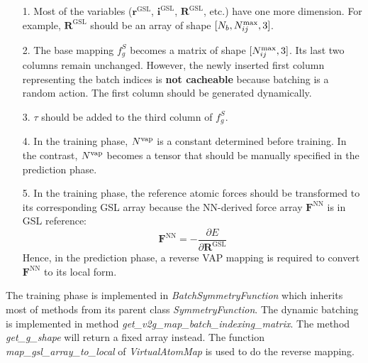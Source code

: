 \documentclass[preprint]{revtex4-2}
\begin{document}
\begin{itemize}
    
    \item[1.] 
    Most of the variables ($\mathbf{r}^{\mathrm{GSL}}$, 
    $\mathbf{i}^{\mathrm{GSL}}$, $\mathbf{R}^{\mathrm{GSL}}$, etc.) have one 
    more dimension. For example, $\mathbf{R}^{\mathrm{GSL}}$ should be an array
    of shape $[N_b, N_{ij}^{\mathrm{max}}, 3]$.

    \item[2.] 
    The base mapping $f_{g}^{S}$ becomes a matrix of shape $[N_{ij}^{\mathrm{max}}, 3]$. Its 
    last two columns remain unchanged. However, the newly inserted first column 
    \textemdash representing the batch indices \textemdash is 
    \textbf{not cacheable} because batching is a random action. The first column
    should be generated dynamically. 

    \item[3.]
    $\tau$ should be added to the third column of $f_{g}^{S}$.

    \item[4.]
    In the training phase, $N^{\mathrm{vap}}$ is a constant determined before training. In 
    the contrast, $N^{\mathrm{vap}}$ becomes a tensor that should be manually specified in 
    the prediction phase.

    \item[5.]
    In the training phase, the reference atomic forces should be transformed to 
    its corresponding GSL array because the NN-derived force array 
    $\mathbf{F}^{\mathrm{NN}}$ is in GSL reference:
    \begin{equation}
        \mathbf{F}^{\mathrm{NN}} = 
        -\frac{\partial{E}}{\partial{\mathbf{R}^{\mathrm{GSL}}}}
    \end{equation}
    Hence, in the prediction phase, a reverse VAP mapping is required to convert
    $\mathbf{F}^{\mathrm{NN}}$ to its local form.

\end{itemize}

The training phase is implemented in \textit{BatchSymmetryFunction} which 
inherits most of methods from its parent class \textit{SymmetryFunction}. 
The dynamic batching is implemented in method 
\textit{get\_v2g\_map\_batch\_indexing\_matrix}. The method 
\textit{get\_g\_shape} will return a fixed array instead. The function
\textit{map\_gsl\_array\_to\_local} of \textit{VirtualAtomMap} is used to do the 
reverse mapping.

% 
%
\end{document}
